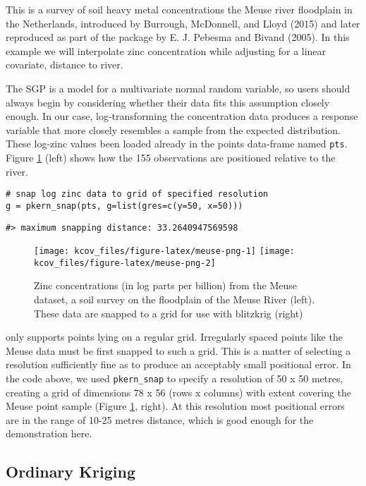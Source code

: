 This is a survey of soil heavy metal concentrations the Meuse river floodplain in the Netherlands, introduced by Burrough, McDonnell, and Lloyd (2015) and later reproduced as part of the  package by E. J. Pebesma and Bivand (2005). In this example we will interpolate zinc concentration while adjusting for a linear covariate, distance to river.

The SGP is a model for a multivariate normal random variable, so users should always begin by considering whether their data fits this assumption closely enough. In our case, log-transforming the concentration data produces a response variable that more closely resembles a sample from the expected distribution. These log-zinc values been loaded already in the  points data-frame named \texttt{pts}. Figure \ref{fig:meuse-png} (left) shows how the 155 observations are positioned relative to the river.

\begin{verbatim}
# snap log zinc data to grid of specified resolution
g = pkern_snap(pts, g=list(gres=c(y=50, x=50)))
\end{verbatim}

\begin{verbatim}
#> maximum snapping distance: 33.2640947569598
\end{verbatim}

\begin{figure}
\texttt{[image: kcov\_files/figure-latex/meuse-png-1]} \texttt{[image: kcov\_files/figure-latex/meuse-png-2]} \caption{Zinc concentrations (in log parts per billion) from the Meuse dataset, a soil survey on the floodplain of the Meuse River (left). These data are snapped to a grid for use with blitzkrig (right)}\label{fig:meuse-png}
\end{figure}

 only supports points lying on a regular grid. Irregularly spaced points like the Meuse data must be first snapped to such a grid. This is a matter of selecting a resolution sufficiently fine as to produce an acceptably small positional error. In the code above, we used \texttt{pkern\_snap} to specify a resolution of 50 x 50 metres, creating a grid of dimensions 78 x 56 (rows x columns) with extent covering the Meuse point sample (Figure \ref{fig:meuse-png}, right). At this resolution most positional errors are in the range of 10-25 metres distance, which is good enough for the demonstration here.

\hypertarget{ordinary-kriging}{%
\subsection{Ordinary Kriging}\label{ordinary-kriging}}

